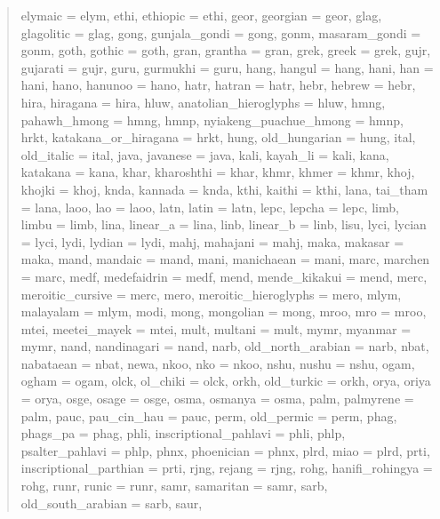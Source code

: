 \documentclass{wg21}
\begin{document}
\begin{quote}
\begin{itemdecl}
{    elymaic = elym,
    ethi,
    ethiopic = ethi,
    geor,
    georgian = geor,
    glag,
    glagolitic = glag,
    gong,
    gunjala_gondi = gong,
    gonm,
    masaram_gondi = gonm,
    goth,
    gothic = goth,
    gran,
    grantha = gran,
    grek,
    greek = grek,
    gujr,
    gujarati = gujr,
    guru,
    gurmukhi = guru,
    hang,
    hangul = hang,
    hani,
    han = hani,
    hano,
    hanunoo = hano,
    hatr,
    hatran = hatr,
    hebr,
    hebrew = hebr,
    hira,
    hiragana = hira,
    hluw,
    anatolian_hieroglyphs = hluw,
    hmng,
    pahawh_hmong = hmng,
    hmnp,
    nyiakeng_puachue_hmong = hmnp,
    hrkt,
    katakana_or_hiragana = hrkt,
    hung,
    old_hungarian = hung,
    ital,
    old_italic = ital,
    java,
    javanese = java,
    kali,
    kayah_li = kali,
    kana,
    katakana = kana,
    khar,
    kharoshthi = khar,
    khmr,
    khmer = khmr,
    khoj,
    khojki = khoj,
    knda,
    kannada = knda,
    kthi,
    kaithi = kthi,
    lana,
    tai_tham = lana,
    laoo,
    lao = laoo,
    latn,
    latin = latn,
    lepc,
    lepcha = lepc,
    limb,
    limbu = limb,
    lina,
    linear_a = lina,
    linb,
    linear_b = linb,
    lisu,
    lyci,
    lycian = lyci,
    lydi,
    lydian = lydi,
    mahj,
    mahajani = mahj,
    maka,
    makasar = maka,
    mand,
    mandaic = mand,
    mani,
    manichaean = mani,
    marc,
    marchen = marc,
    medf,
    medefaidrin = medf,
    mend,
    mende_kikakui = mend,
    merc,
    meroitic_cursive = merc,
    mero,
    meroitic_hieroglyphs = mero,
    mlym,
    malayalam = mlym,
    modi,
    mong,
    mongolian = mong,
    mroo,
    mro = mroo,
    mtei,
    meetei_mayek = mtei,
    mult,
    multani = mult,
    mymr,
    myanmar = mymr,
    nand,
    nandinagari = nand,
    narb,
    old_north_arabian = narb,
    nbat,
    nabataean = nbat,
    newa,
    nkoo,
    nko = nkoo,
    nshu,
    nushu = nshu,
    ogam,
    ogham = ogam,
    olck,
    ol_chiki = olck,
    orkh,
    old_turkic = orkh,
    orya,
    oriya = orya,
    osge,
    osage = osge,
    osma,
    osmanya = osma,
    palm,
    palmyrene = palm,
    pauc,
    pau_cin_hau = pauc,
    perm,
    old_permic = perm,
    phag,
    phags_pa = phag,
    phli,
    inscriptional_pahlavi = phli,
    phlp,
    psalter_pahlavi = phlp,
    phnx,
    phoenician = phnx,
    plrd,
    miao = plrd,
    prti,
    inscriptional_parthian = prti,
    rjng,
    rejang = rjng,
    rohg,
    hanifi_rohingya = rohg,
    runr,
    runic = runr,
    samr,
    samaritan = samr,
    sarb,
    old_south_arabian = sarb,
    saur,
}
\end{itemdecl}
\end{quote}
\end{document}
